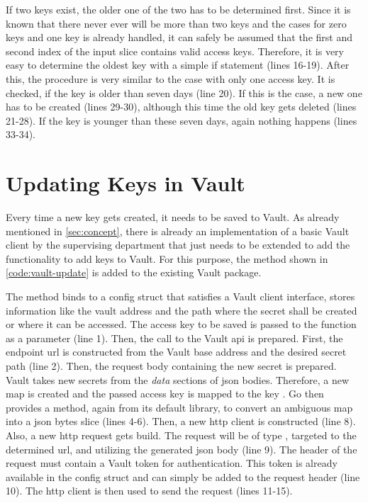 If two keys exist, the older one of the two has to be determined first.
Since it is known that there never ever will be more than two keys and the cases for zero keys and one key is already handled, it can safely be assumed that the first and second index of the input slice contains valid access keys.
Therefore, it is very easy to determine the oldest key with a simple if statement (lines 16-19).
After this, the procedure is very similar to the case with only one access key.
It is checked, if the key is older than seven days (line 20).
If this is the case, a new one has to be created (lines 29-30), although this time the old key gets deleted (lines 21-28).
If the key is younger than these seven days, again nothing happens (lines 33-34).



\section{Updating Keys in Vault}
Every time a new key gets created, it needs to be saved to Vault.
As already mentioned in \autoref{sec:concept}, there is already an implementation of a basic Vault client by the supervising department that just needs to be extended to add the functionality to add keys to Vault.
For this purpose, the method shown in \autoref{code:vault-update} is added to the existing Vault package.

The method binds to a config struct that satisfies a Vault client interface, stores information like the vault address and the path where the secret shall be created or where it can be accessed.
The access key to be saved is passed to the function as a parameter (line 1).
Then, the call to the Vault \ac{api} is prepared.
First, the endpoint \ac{url} is constructed from the Vault base address and the desired secret path (line 2).
Then, the request body containing the new secret is prepared.
Vault takes new secrets from the \emph{data} sections of \ac{json} bodies.
Therefore, a new map is created and the passed access key is mapped to the key .
Go then provides a method, again from its default library, to convert an ambiguous map into a \ac{json} bytes slice (lines 4-6).
Then, a new \ac{http} client is constructed (line 8).
Also, a new \ac{http} request gets build.
The request will be of type , targeted to the determined \ac{url}, and utilizing the generated \ac{json} body (line 9).
The header of the request must contain a Vault token for authentication.
This token is already available in the config struct and can simply be added to the request header (line 10).
The \ac{http} client is then used to send the request (lines 11-15).


